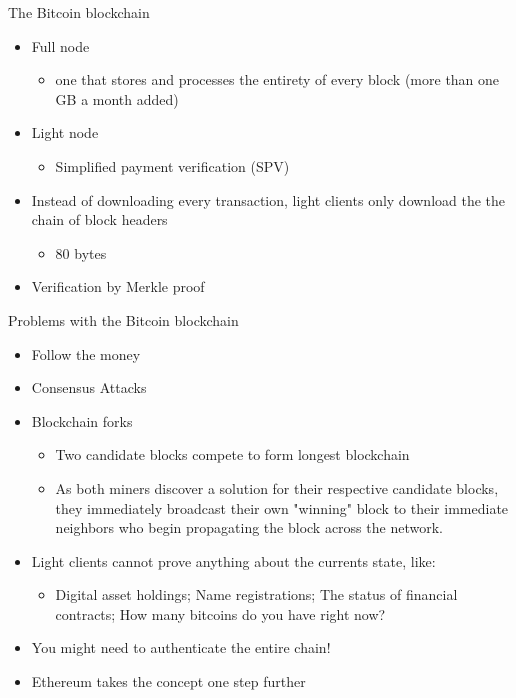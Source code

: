 \documentclass[presentation]{beamer}
\begin{document}
\begin{frame}[label=sec-3-5]{The Bitcoin blockchain}
\begin{itemize}
\item Full node
\begin{itemize}
\item one that stores and processes the entirety of every block (more than one GB a month added)
\end{itemize}
\item Light node
\begin{itemize}
\item \alert{Simplified payment verification} (SPV)
\end{itemize}
\item Instead of downloading every transaction, \alert{light clients} only download the \alert{the chain of block headers}
\begin{itemize}
\item 80 bytes
\end{itemize}
\item Verification by \alert{Merkle proof}
\end{itemize}
\end{frame}
\begin{frame}[label=sec-3-6]{Problems with the Bitcoin blockchain}
\begin{itemize}
\item \alert{Follow the money}
\item Consensus Attacks
\item Blockchain forks
\begin{itemize}
\item Two candidate blocks compete to form longest blockchain
\item As both miners discover a solution for their respective candidate blocks, they immediately broadcast their own "winning" block to their immediate neighbors who begin propagating the block across the network.
\end{itemize}
\item \alert{Light clients} cannot prove anything about the currents state, like:
\begin{itemize}
\item Digital asset holdings; Name registrations; The status of financial contracts; How many bitcoins do you have right now?
\end{itemize}
\item You might need to authenticate \alert{the entire chain}!
\item Ethereum takes the concept one step further
\end{itemize}
\end{frame}
\end{document}
